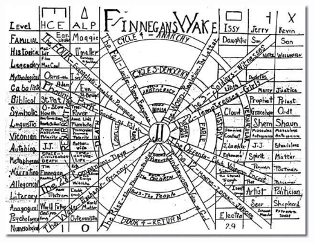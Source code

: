 \documentclass[10pt]{report}
\begin{document}
			\begin{center}
				\includegraphics[width=0.7\linewidth]{"Inglese - Joyce/finnegans_scheme"}
			\end{center}
\end{document}
